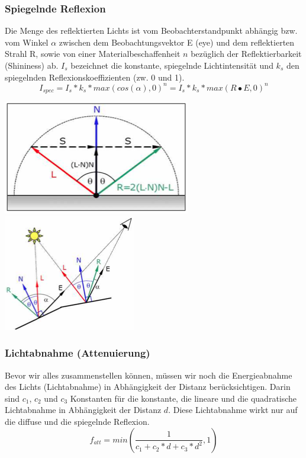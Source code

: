 \documentclass[10pt]{article}
\begin{document}
\subsubsection{Spiegelnde Reflexion}
Die Menge des reflektierten Lichts ist vom Beobachterstandpunkt abhängig bzw. vom Winkel $\alpha$ zwischen dem Beobachtungsvektor E (eye) und dem reflektierten Strahl R, sowie von einer Materialbeschaffenheit $n$ bezüglich der Reflektierbarkeit (Shininess) ab. $I_s$ bezeichnet die konstante, spiegelnde Lichtintensität und $k_s$ den spiegelnden Reflexionskoeffizienten (zw. 0 und 1).
\begin{equation}
I_{spec}=I_s * k_s * max( cos(\alpha), 0)^n = I_s * k_s * max(R \bullet E, 0)^n
\end{equation}
\begin{center}
	\includegraphics[scale=0.4]{reflektierender_strahl.png}
	\includegraphics[scale=0.4]{spiegelnde_reflexion.png}
\end{center}
\subsubsection{Lichtabnahme (Attenuierung)}
Bevor wir alles zusammenstellen können, müssen wir noch die Energieabnahme des Lichts (Lichtabnahme) in Abhängigkeit der Distanz berücksichtigen. Darin sind $c_1$, $c_2$ und $c_3$ Konstanten für die konstante, die lineare und die quadratische Lichtabnahme in Abhängigkeit der Distanz $d$. Diese Lichtabnahme wirkt nur auf die diffuse und die spiegelnde Reflexion.
\begin{equation}
f_{att}=min(\frac{1}{c_1 + c_2 * d + c_3 * d^2}, 1)
\end{equation}
\end{document}
